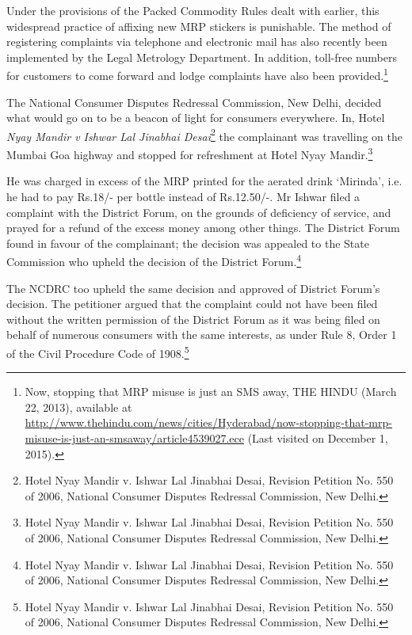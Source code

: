 \begin{multicols}{2}
\noi
Under the provisions of the Packed Commodity Rules dealt with earlier, this widespread
practice of affixing new MRP stickers is punishable. The method of registering complaints via
telephone and electronic mail has also recently been implemented by the Legal Metrology
Department. In addition, toll-free numbers for customers to come forward and lodge
complaints have also been provided.\footnote{Now, stopping that MRP misuse is just an SMS away, THE HINDU (March 22, 2013), available at  \url{http://www.thehindu.com/news/cities/Hyderabad/now-stopping-that-mrp-misuse-is-just-an-smsaway/article4539027.ece} (Last visited on December 1, 2015).}

\noi
The National Consumer Disputes Redressal Commission, New Delhi, decided what would go
on to be a beacon of light for consumers everywhere. In, Hotel \textit{Nyay Mandir v Ishwar Lal
Jinabhai Desai}\footnote{Hotel Nyay Mandir v. Ishwar Lal Jinabhai Desai, Revision Petition No. 550 of 2006, National Consumer Disputes Redressal Commission, New Delhi.} the complainant was travelling on the Mumbai Goa highway and stopped for refreshment at Hotel Nyay Mandir.\footnote{Hotel Nyay Mandir v. Ishwar Lal Jinabhai Desai, Revision Petition No. 550 of 2006, National Consumer Disputes Redressal Commission, New Delhi.}

\noi
He was charged in excess of the MRP printed for the aerated drink ‘Mirinda’, i.e. he had to pay
Rs.18/- per bottle instead of Rs.12.50/-. Mr Ishwar filed a complaint with the District Forum,
on the grounds of deficiency of service, and prayed for a refund of the excess money among
other things. The District Forum found in favour of the complainant; the decision was appealed
to the State Commission who upheld the decision of the District Forum.\footnote{Hotel Nyay Mandir v. Ishwar Lal Jinabhai Desai, Revision Petition No. 550 of 2006, National Consumer Disputes Redressal Commission, New Delhi.}

\vspace{-.15cm}

\noi
The NCDRC too upheld the same decision and approved of District Forum’s decision. The
petitioner argued that the complaint could not have been filed without the written permission
of the District Forum as it was being filed on behalf of numerous consumers with the same
interests, as under Rule 8, Order 1 of the Civil Procedure Code of 1908.\footnote{Hotel Nyay Mandir v. Ishwar Lal Jinabhai Desai, Revision Petition No. 550 of 2006, National Consumer Disputes Redressal Commission, New Delhi.}


\end{multicols}
